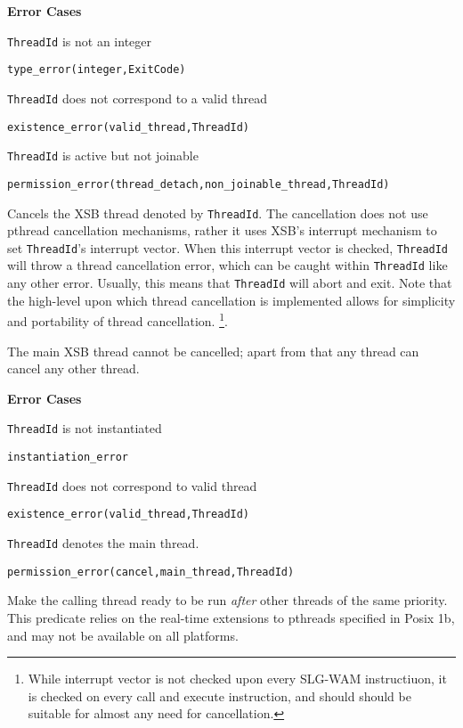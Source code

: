 \begin{description}
{\bf Error Cases}
\bi
\item 	{\tt ThreadId} is not an integer
\bi
\item 	{\tt type\_error(integer,ExitCode)}
\ei
\item   {\tt ThreadId} does not correspond to a valid thread
\bi
\item   {\tt existence\_error(valid\_thread,ThreadId)}
\ei
\item 	{\tt ThreadId} is active but not joinable
\bi
\item 	{\tt permission\_error(thread\_detach,non\_joinable\_thread,ThreadId)}
\ei
\ei

%
Cancels the XSB thread denoted by {\tt ThreadId}.  The cancellation
does not use pthread cancellation mechanisms, rather it uses XSB's
interrupt mechanism to set {\tt ThreadId}'s interrupt vector.  When
this interrupt vector is checked, {\tt ThreadId} will throw a thread
cancellation error, which can be caught within {\tt ThreadId} like any
other error.  Usually, this means that {\tt ThreadId} will abort and
exit.  Note that the high-level upon which thread cancellation is
implemented allows for simplicity and portability of thread
cancellation.  \footnote{While interrupt vector is not checked upon
  every SLG-WAM instructiuon, it is checked on every {\sf call} and
  {\sf execute} instruction, and should should be suitable for almost
  any need for cancellation.}.

The main XSB thread cannot be cancelled; apart from that any thread
can cancel any other thread.

{\bf Error Cases}
\bi
\item 	{\tt ThreadId} is not instantiated
\bi
\item 	{\tt instantiation\_error}
\ei
%
\item   {\tt ThreadId} does not correspond to valid thread
\bi
\item   {\tt existence\_error(valid\_thread,ThreadId)}
\ei
\item   {\tt ThreadId} denotes the main thread.
\bi
\item   {\tt permission\_error(cancel,main\_thread,ThreadId)}
\ei
\ei

% 
Make the calling thread ready to be run {\em after} other threads of
the same priority.  This predicate relies on the real-time extensions
to pthreads specified in Posix 1b, and may not be available on all
platforms.


\end{description}
